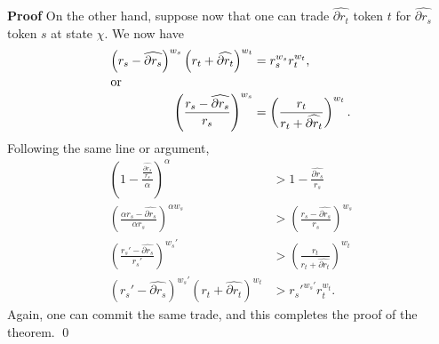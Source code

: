\documentclass[10pt,a4paper]{amsart}
\newenvironment{proof}{\vspace{1ex}\noindent\textbf{Proof}\hspace{0.5em}}{\hfill\qed\vspace{1ex}}
\begin{document}
\begin{proof}
On the other hand, suppose now that one can trade $\widehat{\partial r_t}$ token $t$ for $\widehat{\partial r_s}$ token $s$ at state $\chi$. We now have
\begin{align*}
\left(r_s-\widehat{\partial r_s}\right)^{w_s}\left(r_t+\widehat{\partial r_t}\right)^{w_t} & =r_s^{w_s}r_t^{w_t}, \\
\intertext{or}
\left(\frac{r_s-\widehat{\partial r_s}}{r_s}\right)^{w_s} & =\left(\frac{r_t}{r_t+\widehat{\partial r_t}}\right)^{w_t}.
\end{align*}
Following the same line or argument,
\begin{align*}
\left(1-\frac{\frac{\widehat{\partial r_s}}{r_s}}{\alpha}\right)^\alpha & >1-\frac{\widehat{\partial r_s}}{r_s} \\
\left(\frac{\alpha r_s-\widehat{\partial r_s}}{\alpha r_s}\right)^{\alpha w_s} & >\left(\frac{r_s-\widehat{\partial r_s}}{r_s}\right)^{w_s} \\
\left(\frac{r_s'-\widehat{\partial r_s}}{r_s'}\right)^{w_s'} & >\left(\frac{r_t}{r_t+\widehat{\partial r_t}}\right)^{w_t} \\
\left(r_s'-\widehat{\partial r_s}\right)^{w_s'}\left(r_t+\widehat{\partial r_t}\right)^{w_t} & >r_s'^{w_s'}r_t^{w_t}.
\end{align*}
Again, one can commit the same trade, and this completes the proof of the theorem.
\end{proof}
\end{document}
